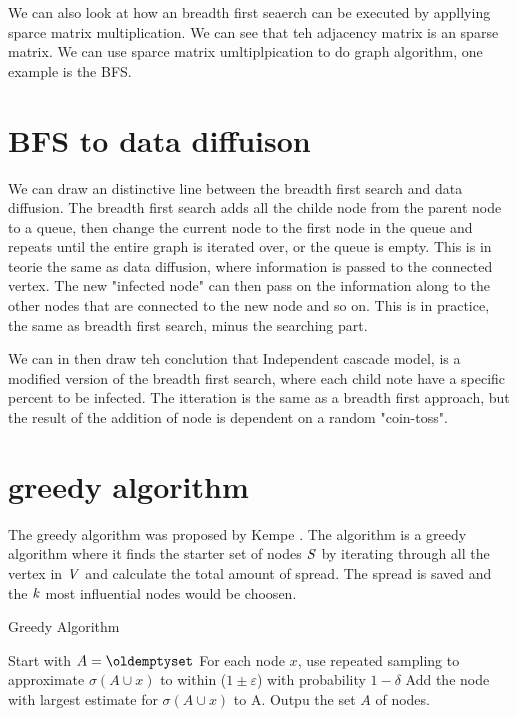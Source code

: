 We can also look at how an breadth first seaerch can be executed by appllying  sparce matrix multiplication. We can see that teh adjacency matrix is an sparse matrix. We can use sparce matrix umltiplpication to do graph algorithm, one example is the BFS. 


\section{BFS to data diffuison}
We can draw an distinctive line between the breadth first search and data diffusion. The breadth first search adds all the childe node from the parent node to a queue, then change the current node to the first node in the queue and repeats until the entire graph is iterated over, or the queue is empty. This is in teorie the same as data diffusion, where information is passed to the connected vertex. The new "infected node" can then pass on the information along to the other nodes that are connected to the new node and so on. This is in practice, the same as breadth first search, minus the searching part. 

We can in then draw teh conclution that Independent cascade model, is a modified version of the breadth first search, where each child note have a specific percent to be infected. The itteration is the same as a breadth first approach, but the result of the addition of node is dependent on a random "coin-toss".


\section{greedy algorithm}
The  greedy algorithm was proposed by Kempe \cite{MaximizeSpread2015}. The algorithm is a greedy algorithm where it finds the starter set of nodes $\it{S}$ by iterating through all the vertex in $\it{V}$ and calculate the total amount of spread. The spread is saved and the $\it{k}$ most influential nodes would be choosen.

 \begin{algorithm}
\caption{Greedy Algorithm}
\begin{algorithmic}[1]
\State Start with $A = \oldemptyset$
\State For each node $x$, use repeated sampling to approximate $\sigma(A \cup {x}) $ to within ($1 \pm \varepsilon$) with probability
$1 − \delta$
\State Add the node with largest estimate for $\sigma(A \cup {x})$ to A.
\EndWhile
\State Outpu the set $A$ of nodes.
\end{algorithmic}
\end{algorithm}

